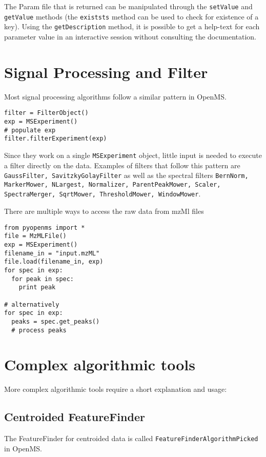 \documentclass[10pt]{article}
\begin{document}
The Param file that is returned can be manipulated through the \texttt{setValue} and
\texttt{getValue} methods (the \texttt{existsts} method can be used to check for existence of a
key). Using the \texttt{getDescription} method, it is possible to get a help-text for
each parameter value in an interactive session without consulting the documentation.

\section{Signal Processing and Filter}
Most signal processing algorithms follow a similar pattern in OpenMS.

\begin{verbatim}
filter = FilterObject()
exp = MSExperiment()
# populate exp
filter.filterExperiment(exp)
\end{verbatim}

Since they work on a single \texttt{MSExperiment} object, little input is needed to
execute a filter directly on the data. Examples of filters that follow this
pattern are \texttt{GaussFilter, SavitzkyGolayFilter} as well as the spectral
filters \texttt{BernNorm, MarkerMower, NLargest, Normalizer, ParentPeakMower,
Scaler, SpectraMerger, SqrtMower, ThresholdMower, WindowMower}.

There are multiple ways to access the raw data from mzMl files

\begin{verbatim}
from pyopenms import *
file = MzMLFile()
exp = MSExperiment()
filename_in = "input.mzML"
file.load(filename_in, exp)
for spec in exp:
  for peak in spec:
    print peak

# alternatively 
for spec in exp:
  peaks = spec.get_peaks()
  # process peaks
\end{verbatim}

\section{Complex algorithmic tools}

More complex algorithmic tools require a short explanation and usage:

\subsection{Centroided FeatureFinder}

The FeatureFinder for centroided data is called
\texttt{FeatureFinderAlgorithmPicked} in OpenMS.
\end{document}
